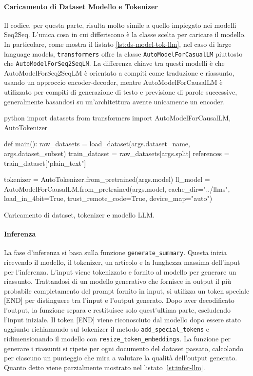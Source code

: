 \documentclass[12pt,a4paper,twoside,openright]{book}
\begin{document}
\paragraph{Caricamento di Dataset Modello e Tokenizer}
Il codice, per questa parte, risulta molto simile a quello impiegato nei modelli Seq2Seq. L'unica cosa in cui differiscono è la classe scelta per caricare il modello. In particolare, come mostra il listato \ref{lst:ds-model-tok-llm}, nel caso di large language models, \texttt{transformers} offre la classe \texttt{AutoModelForCasualLM} piuttosto che \texttt{AutoModelForSeq2SeqLM}. 
La differenza chiave tra questi modelli è che AutoModelForSeq2SeqLM è orientato a compiti come traduzione e riassunto, usando un approccio encoder-decoder, mentre AutoModelForCausalLM è utilizzato per compiti di generazione di testo e previsione di parole successive, generalmente basandosi su un'architettura avente unicamente un encoder.

\begin{customcode}
\begin{mintedbox}{python}
import datasets
from transformers import AutoModelForCausalLM, AutoTokenizer

def main():
    raw_datasets = load_dataset(args.dataset_name, args.dataset_subset)
    train_dataset = raw_datasets[args.split]
    references = train_dataset["plain_text"]  

    tokenizer = AutoTokenizer.from_pretrained(args.model)
    ll_model = AutoModelForCausalLM.from_pretrained(args.model, cache_dir="../llms", load_in_4bit=True, trust_remote_code=True, device_map="auto") 
\end{mintedbox}
\caption{Caricamento di dataset, tokenizer e modello LLM.}
\label{lst:ds-model-tok-llm}
\end{customcode}

\paragraph{Inferenza}
La fase d'inferenza si basa sulla funzione \texttt{generate\_summary}.
Questa inizia ricevendo il modello, il tokenizer, un articolo e la lunghezza massima dell'input per l'inferenza. L'input viene tokenizzato e fornito al modello per generare un riassunto. Trattandosi di un modello generativo che fornisce in output il più probabile completamento del prompt fornito in input, si utilizza un token speciale [END] per distinguere tra l'input e l'output generato. Dopo aver decodificato l'output, la funzione separa e restituisce solo quest'ultima parte, escludendo l'input iniziale.  Il token [END] viene riconosciuto dal modello dopo essere stato aggiunto richiamando sul tokenizer il metodo \texttt{add\_special\_tokens} e ridimensionando il modello con \texttt{resize\_token\_embeddings}.
La funzione per generare i riassunti si ripete per ogni documento del dataset passato, calcolando per ciascuno un punteggio che mira a valutare la qualità dell'output generato. 
Quanto detto viene parzialmente mostrato nel listato \ref{lst:infer-llm}.
\end{document}
